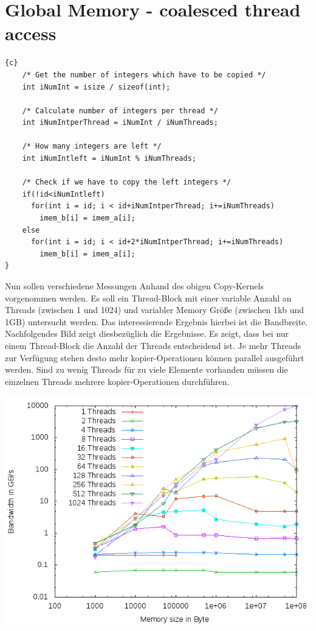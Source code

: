 \documentclass{article}
\newcommand{\enterProblemHeader}[1]{
}
\newcommand{\exitProblemHeader}[1]{
}
\newcounter{homeworkProblemCounter} %
\newcommand{\homeworkProblemName}{}
\newenvironment{homeworkProblem}[1][Problem \arabic{homeworkProblemCounter}]{ %
\stepcounter{homeworkProblemCounter} %
\renewcommand{\homeworkProblemName}{#1} %
\section{\homeworkProblemName} %
}{
}
\begin{document}
\begin{homeworkProblem}[Global Memory - coalesced thread access]
\begin{lstlisting}{c}
    /* Get the number of integers which have to be copied */
    int iNumInt = isize / sizeof(int);
    
    /* Calculate number of integers per thread */
    int iNumIntperThread = iNumInt / iNumThreads;
    
    /* How many integers are left */
    int iNumIntleft = iNumInt % iNumThreads;
    
    /* Check if we have to copy the left integers */
    if(!id<iNumIntleft)
      for(int i = id; i < id+iNumIntperThread; i+=iNumThreads)
        imem_b[i] = imem_a[i];
    else
      for(int i = id; i < id+2*iNumIntperThread; i+=iNumThreads)
        imem_b[i] = imem_a[i];
}
\end{lstlisting}
Nun sollen verschiedene Messungen Anhand des obigen Copy-Kernels vorgenommen werden.
Es soll ein Thread-Block mit einer variable Anzahl an Threads (zwischen 1 und 1024) und 
variabler Memory Größe (zwischen 1kb und 1GB) untersucht werden. Das interessierende
Ergebnis hierbei ist die Bandbreite.
\\
Nachfolgendes Bild zeigt diesbezüglich die Ergebnisse. Es zeigt, dass bei nur einem
Thread-Block die Anzahl der Threads entscheidend ist. Je mehr Threads zur Verfügung stehen
desto mehr kopier-Operationen können parallel ausgeführt werden. Sind zu wenig Threads
für zu viele Elemente vorhanden müssen die einzelnen Threads mehrere kopier-Operationen
durchführen.
\begin{center}
\includegraphics[width=0.8\columnwidth]{../src/part_2/image.png}
\end{center}
\end{homeworkProblem}
\pagebreak
\end{document}
